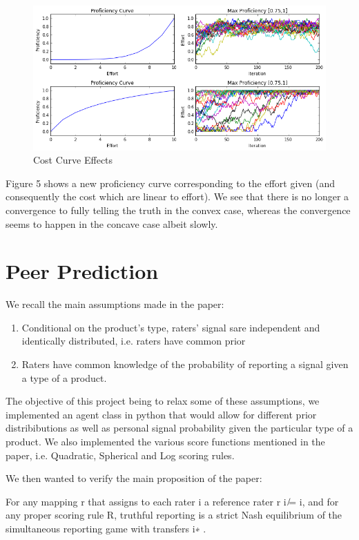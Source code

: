 \documentclass{scrartcl}
\begin{document}
 \begin{figure}[H]
	\caption{Cost Curve Effects}
	\centering
	\includegraphics[width=1.0\textwidth]{cost_curves}
\end{figure}

Figure 5 shows a new proficiency curve corresponding to the effort given (and consequently the cost which are linear to effort). We see that there is no longer a convergence to fully telling the truth in the convex case, whereas the convergence seems to happen in the concave case albeit slowly.

\section{Peer Prediction}

We recall the main assumptions made in the paper:

\begin{enumerate}
\item Conditional on the product’s type, raters’ signal sare independent and identically distributed, i.e. raters have common prior
\item Raters have common knowledge of the probability of reporting a signal given a type of a product.
\end{enumerate}

The objective of this project being to relax some of these assumptions, we implemented an agent class in python that would allow for different prior distribibutions as well as personal signal probability given the particular type of a product. We also implemented the various score functions mentioned in the paper, i.e. Quadratic, Spherical and Log scoring rules.

We then wanted to verify the main proposition of the paper:

\begin{displayquote}
For any mapping r that assigns to each rater i a reference rater r i  ̸= i, and for any proper scoring rule R, truthful reporting is a strict Nash equilibrium of the simultaneous reporting game with transfers  i∗ .
\end{displayquote}
\end{document}
